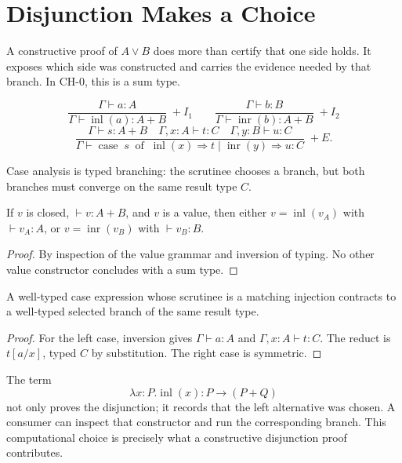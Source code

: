 \chapter{Disjunction Makes a Choice}
\label{ch:disjunction}

A constructive proof of $A\lor B$ does more than certify that one side holds. It exposes which side was constructed and carries the evidence needed by that branch. In $\mathrm{CH}\text{-}0$, this is a sum type.

\begin{formal}[title={Sum rules}]
\[
\frac{\Gamma\vdash a:A}{\Gamma\vdash\operatorname{inl}(a):A+B}\;+I_1
\qquad
\frac{\Gamma\vdash b:B}{\Gamma\vdash\operatorname{inr}(b):A+B}\;+I_2
\]
\[
\frac{\Gamma\vdash s:A+B\quad\Gamma,x{:}A\vdash t:C\quad\Gamma,y{:}B\vdash u:C}
{\Gamma\vdash\operatorname{case}\;s\;\operatorname{of}\;\operatorname{inl}(x)\Rightarrow t\mid\operatorname{inr}(y)\Rightarrow u:C}\;+E.
\]
\end{formal}

Case analysis is typed branching: the scrutinee chooses a branch, but both branches must converge on the same result type $C$.



\begin{lemma}
If $v$ is closed, $\vdash v:A+B$, and $v$ is a value, then either $v=\operatorname{inl}(v_A)$ with $\vdash v_A:A$, or $v=\operatorname{inr}(v_B)$ with $\vdash v_B:B$.
\end{lemma}
\begin{proof}
By inspection of the value grammar and inversion of typing. No other value constructor concludes with a sum type.
\end{proof}

\begin{theorem}
A well-typed case expression whose scrutinee is a matching injection contracts to a well-typed selected branch of the same result type.
\end{theorem}
\begin{proof}
For the left case, inversion gives $\Gamma\vdash a:A$ and $\Gamma,x{:}A\vdash t:C$. The reduct is $t[a/x]$, typed $C$ by substitution. The right case is symmetric.
\end{proof}



\begin{workedexample}[title={Choice is evidence}]
The term
\[
\lambda x{:}P.\operatorname{inl}(x):P\to(P+Q)
\]
not only proves the disjunction; it records that the left alternative was chosen. A consumer can inspect that constructor and run the corresponding branch. This computational choice is precisely what a constructive disjunction proof contributes.
\end{workedexample}

